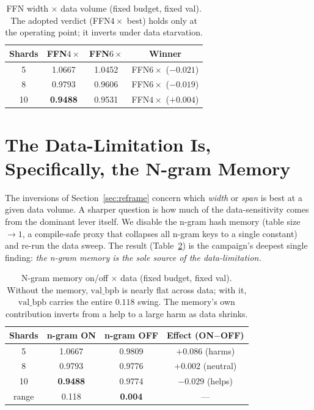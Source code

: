 \documentclass{article}
\newcommand{\valbpb}{\mathrm{val\_bpb}}
\begin{document}
\begin{table}[t]
\caption{FFN width $\times$ data volume (fixed budget, fixed val). The adopted verdict (FFN$4\times$ best) holds only at the operating point; it inverts under data starvation.}
\label{tab:invert}
\vskip 0.1in
\begin{center}
\begin{small}
\begin{tabular}{cccc}
\toprule
Shards & FFN$4\times$ & FFN$6\times$ & Winner \\
\midrule
5  & 1.0667 & 1.0452 & FFN$6\times$ ($-0.021$) \\
8  & 0.9793 & 0.9606 & FFN$6\times$ ($-0.019$) \\
10 & \textbf{0.9488} & 0.9531 & FFN$4\times$ ($+0.004$) \\
\bottomrule
\end{tabular}
\end{small}
\end{center}
\vskip -0.15in
\end{table}

\section{The Data-Limitation Is, Specifically, the N-gram Memory}
\label{sec:ngram}

The inversions of Section~\ref{sec:reframe} concern which \emph{width} or \emph{span} is best at a given data volume. A sharper question is how much of the data-sensitivity comes from the dominant lever itself. We disable the n-gram hash memory (table size $\to 1$, a compile-safe proxy that collapses all n-gram keys to a single constant) and re-run the data sweep. The result (Table~\ref{tab:ngram}) is the campaign's deepest single finding: \emph{the n-gram memory is the sole source of the data-limitation.}

\begin{table}[t]
\caption{N-gram memory on/off $\times$ data (fixed budget, fixed val). Without the memory, $\valbpb$ is nearly flat across data; with it, $\valbpb$ carries the entire $0.118$ swing. The memory's own contribution inverts from a help to a large harm as data shrinks.}
\label{tab:ngram}
\vskip 0.1in
\begin{center}
\begin{small}
\begin{tabular}{cccc}
\toprule
Shards & n-gram ON & n-gram OFF & Effect (ON$-$OFF) \\
\midrule
5  & 1.0667 & 0.9809 & $+0.086$ (harms) \\
8  & 0.9793 & 0.9776 & $+0.002$ (neutral) \\
10 & \textbf{0.9488} & 0.9774 & $-0.029$ (helps) \\
\midrule
range & 0.118 & \textbf{0.004} & --- \\
\bottomrule
\end{tabular}
\end{small}
\end{center}
\vskip -0.15in
\end{table}
\end{document}
